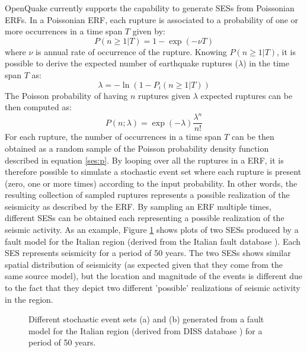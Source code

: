 OpenQuake currently supports the capability to generate SESs from Poissonian 
ERFs. In a Poissonian ERF, each rupture is associated to a probability of one 
or more occurrences in a time span $T$ given by:
\begin{equation}
P(n\geq1|T) = 1 - \exp(-\nu T)
\end{equation} 
where $\nu$ is annual rate of occurrence of the rupture. Knowing $P(n\geq1|T)$, 
it is possible to derive the expected number of earthquake ruptures ($\lambda$) 
in the time span $T$  as:
\begin{equation}
\lambda = - \ln(1 - P_{i}(n\geq1|T))
\end{equation} 
The Poisson probability of having $n$ ruptures given $\lambda$ expected ruptures
can be then computed as:
\begin{equation}
P(n;\lambda) = \exp(-\lambda)\frac{\lambda^{n}}{n!}
\label{ses:p}
\end{equation}
For each rupture, the number of occurrences in a time span $T$ can be then 
obtained as a random sample of the Poisson probability density function 
described in equation \ref{ses:p}. By looping over all the ruptures in a 
ERF, it is therefore possible to simulate a stochastic event set where 
each rupture is present (zero, one or more times) according to the input
probability. In other words, the resulting collection of sampled ruptures
represents a possible realization of the seismicity as described by the ERF. 
By sampling an ERF multiple times, different SESs can be obtained each 
representing a possible realization of the seismic activity. As an example, 
Figure \ref{ses_italy} shows plots of two SESs produced by a fault model 
for the Italian region (derived from the Italian fault database 
\citep{basili2008}). Each SES represents seismicity for a period of 50 years.
The two SESs shows similar spatial distribution of seismicity (as expected 
given that they come from the same source model), but the location and 
magnitude of the events is different due to the fact that they depict 
two different 'possible' realizations of seismic activity in the region.
\begin{figure}[!htbp]
\begin{center}
\caption{Different stochastic event sets (a) and (b) generated from a 
fault model for the Italian region (derived from DISS database 
\citep{basili2008}) for a period of 50 years.}
\label{ses_italy}
\end{center}
\end{figure}
%
